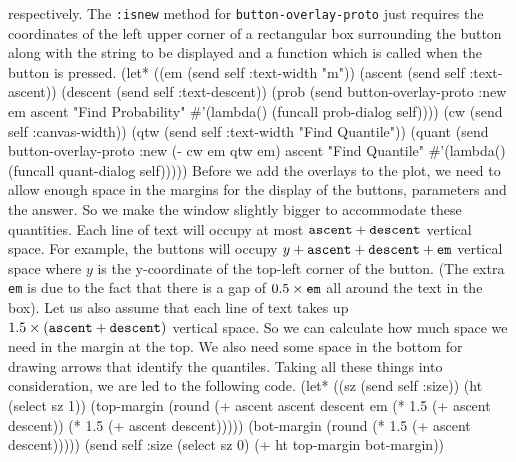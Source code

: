respectively. The {\tt{}:isnew} method for {\tt{}button-overlay-proto} just
requires the coordinates of the left upper corner of a rectangular box
surrounding the button along with the string to be displayed and a
function which is called when the button is pressed. 
\nwenddocs{}\plusendmoddef
  (let* ((em (send self :text-width "m"))
         (ascent (send self :text-ascent))
         (descent (send self :text-descent))
         (prob (send button-overlay-proto :new em ascent
                     "Find Probability" 
                     #'(lambda() (funcall prob-dialog self))))
         (cw (send self :canvas-width))
         (qtw (send self :text-width "Find Quantile"))
         (quant (send button-overlay-proto :new (- cw em qtw em) ascent
                      "Find Quantile"
                       #'(lambda() (funcall quant-dialog self)))))
\nwendcode{}\nwdocspar
Before we add the overlays to the plot, we need to allow enough space
in the margins for the display of the buttons, parameters and the
answer. So we make the window slightly bigger to accommodate
these quantities. Each line of text will occupy at most
$\mbox{{\tt{}ascent}} + \mbox{{\tt{}descent}}$ vertical space. For example,
the buttons will occupy $y + \mbox{{\tt{}ascent}} + \mbox{{\tt{}descent}} +
\mbox{{\tt{}em}}$ vertical space where $y$ is the y-coordinate of the
top-left corner of the button. (The extra {\tt{}em} is due to the fact
that there is a gap of $0.5\times\mbox{{\tt{}em}}$ all around the text in
the box). Let us also assume that each line of text takes up
$1.5\times(\mbox{{\tt{}ascent}} + \mbox{{\tt{}descent}})$ vertical space. So
we can calculate how much space we need in the margin at the top. We
also need some space in the bottom for drawing arrows that identify
the quantiles. Taking all these things into consideration, we are led
to the following code.
\nwenddocs{}\plusendmoddef
    (let* ((sz (send self :size))
           (ht (select sz 1))
           (top-margin (round (+ ascent ascent descent em
                                 (* 1.5 (+ ascent descent))
                                 (* 1.5 (+ ascent descent)))))
           (bot-margin (round (* 1.5 (+ ascent descent)))))
       (send self :size (select sz 0) (+ ht top-margin bot-margin))

